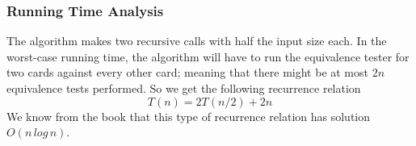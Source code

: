 \documentclass[12pt, oneside]{article}
\begin{document}
\subsubsection*{Running Time Analysis}
The algorithm makes two recursive calls with half the input size each. In the worst-case running time, the algorithm will have to run the equivalence tester for two cards against every other card; meaning that there might be at most $2n$ equivalence tests performed. So we get the following recurrence relation
\[ T(n) = 2T(n/2) + 2n \]
We know from the book that this type of recurrence relation has solution $O(n\,log\,n)$.
\end{document}
